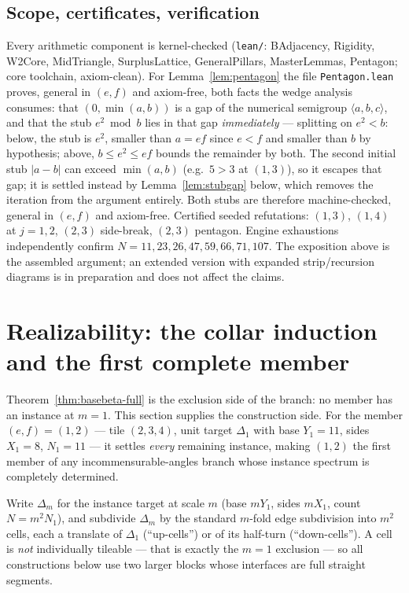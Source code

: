 \documentclass[11pt,reqno]{amsart}
\theoremstyle{plain}
\theoremstyle{definition}
\begin{document}
\subsection{Scope, certificates, verification}
Every arithmetic component is kernel-checked (\texttt{lean/}: BAdjacency, Rigidity, W2Core,
MidTriangle, SurplusLattice, GeneralPillars, MasterLemmas, Pentagon; core toolchain,
axiom-clean). For Lemma~\ref{lem:pentagon} the file \texttt{Pentagon.lean} proves, general in
$(e,f)$ and axiom-free, both facts the wedge analysis consumes: that $(0,\min(a,b))$ is a gap of
the numerical semigroup $\langle a,b,c\rangle$, and that the stub $e^2 \bmod b$ lies in that gap
\emph{immediately} --- splitting on $e^2<b$: below, the stub is $e^2$, smaller than $a=ef$ since
$e<f$ and smaller than $b$ by hypothesis; above, $b\le e^2\le ef$ bounds the remainder by both.
The second initial stub $|a-b|$ can exceed $\min(a,b)$ (e.g.\ $5>3$ at $(1,3)$), so it escapes that
gap; it is settled instead by Lemma~\ref{lem:stubgap} below, which removes the iteration from the
argument entirely. Both stubs are therefore machine-checked, general in $(e,f)$ and axiom-free.
Certified seeded refutations: $(1,3)$, $(1,4)$ at $j=1,2$, $(2,3)$ side-break, $(2,3)$ pentagon.
Engine exhaustions independently confirm $N=11,23,26,47,59,66,71,107$. The exposition above is
the assembled argument; an extended version with expanded strip/recursion diagrams is in
preparation and does not affect the claims.

\section{Realizability: the collar induction and the first complete member}\label{sec:comprealize}

Theorem~\ref{thm:basebeta-full} is the exclusion side of the branch: no member has an instance at
$m=1$. This section supplies the construction side. For the member $(e,f)=(1,2)$ --- tile
$(2,3,4)$, unit target $\Delta_1$ with base $Y_1=11$, sides $X_1=8$, $N_1=11$ --- it settles
\emph{every} remaining instance, making $(1,2)$ the first member of any incommensurable-angles
branch whose instance spectrum is completely determined.

Write $\Delta_m$ for the instance target at scale $m$ (base $mY_1$, sides $mX_1$, count
$N=m^2N_1$), and subdivide $\Delta_m$ by the standard $m$-fold edge subdivision into $m^2$ cells,
each a translate of $\Delta_1$ (``up-cells'') or of its half-turn (``down-cells''). A cell is
\emph{not} individually tileable --- that is exactly the $m=1$ exclusion --- so all constructions
below use two larger blocks whose interfaces are full straight segments.
\end{document}
